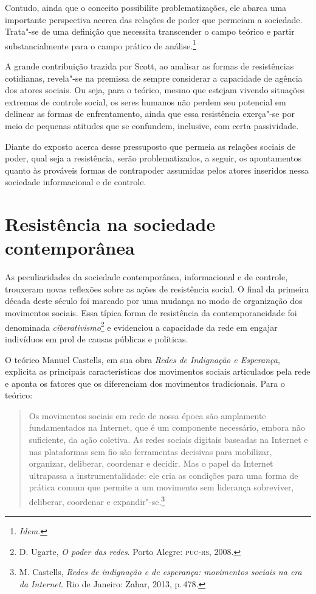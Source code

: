 Contudo, ainda que o conceito possibilite problematizações, ele abarca
uma importante perspectiva acerca das relações de poder que permeiam a
sociedade. Trata"-se de uma definição que necessita transcender o campo
teórico e partir substancialmente para o campo prático de análise.\footnote{\textit{Idem}.}

A grande contribuição trazida por Scott, ao analisar as formas de
resistências cotidianas, revela"-se na premissa de sempre considerar a
capacidade de agência dos atores sociais. Ou seja, para o teórico, mesmo
que estejam vivendo situações extremas de controle social, os seres
humanos não perdem seu potencial em delinear as formas de enfrentamento,
ainda que essa resistência exerça"-se por meio de pequenas atitudes 
que se confundem, inclusive, com certa passividade.

Diante do exposto acerca desse pressuposto que permeia as relações
sociais de poder, qual seja a resistência, serão problematizados, a
seguir, os apontamentos quanto às prováveis formas de contrapoder
assumidas pelos atores inseridos nessa sociedade informacional e de
controle.

\section{Resistência na sociedade contemporânea}

As peculiaridades da sociedade contemporânea, informacional e de
controle, trouxeram novas reflexões sobre as ações de resistência
social. O final da primeira década deste século foi marcado por uma
mudança no modo de organização dos movimentos sociais. Essa típica forma
de resistência da contemporaneidade foi denominada \textit{ciberativismo}\footnote{D. Ugarte, \textit{O poder das redes}. Porto Alegre: \textsc{puc-rs}, 2008.} e evidenciou a capacidade da rede em engajar indivíduos
em prol de causas públicas e políticas.

O teórico Manuel Castells, em sua obra \textit{Redes de Indignação e
Esperança}, explicita as principais características dos movimentos
sociais articulados pela rede e aponta os fatores que os diferenciam dos
movimentos tradicionais. Para o teórico:

\begin{quote}
Os movimentos sociais em rede de nossa época são amplamente
fundamentados na Internet, que é um componente necessário, embora não
suficiente, da ação coletiva. As redes sociais digitais baseadas na
Internet e nas plataformas sem fio são ferramentas decisivas para
mobilizar, organizar, deliberar, coordenar e decidir. Mas o papel da
Internet ultrapassa a instrumentalidade: ele cria as condições para uma
forma de prática comum que permite a um movimento sem liderança
sobreviver, deliberar, coordenar e expandir"-se.\footnote{M. Castells, \textit{Redes de indignação e de esperança: movimentos sociais na era da Internet}. Rio de Janeiro: Zahar, 2013, p.\,478.}
\end{quote}

